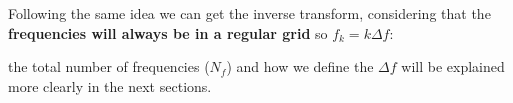 
\newp Following the same idea we can get the inverse transform, considering that the \textbf{frequencies will always be in a regular grid} so $f_k = k \Delta f$:


\newp the total number of frequencies ($N_f$) and how we define the $\Delta f$ will be explained more clearly in the next sections.

